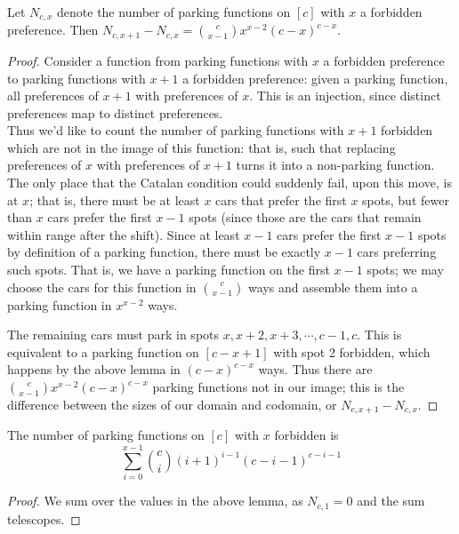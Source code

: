 \begin{lemma}
    Let $N_{c,x}$ denote the number of parking functions on $[c]$ with $x$ a forbidden preference. Then $N_{c,x+1}-N_{c,x}=\binom{c}{x-1}x^{x-2}(c-x)^{c-x}.$
\end{lemma}

\begin{proof}
    Consider a function from parking functions with $x$ a forbidden preference to parking functions with $x+1$ a forbidden preference: given a parking function, all preferences of $x+1$ with preferences of $x.$ This is an injection, since distinct preferences map to distinct preferences.\\
    
    Thus we'd like to count the number of parking functions with $x+1$ forbidden which are not in the image of this function: that is, such that replacing preferences of $x$ with preferences of $x+1$ turns it into a non-parking function.\\

    The only place that the Catalan condition could suddenly fail, upon this move, is at $x$; that is, there must be at least $x$ cars that prefer the first $x$ spots, but fewer than $x$ cars prefer the first $x-1$ spots (since those are the cars that remain within range after the shift). Since at least $x-1$ cars prefer the first $x-1$ spots by definition of a parking function, there must be exactly $x-1$ cars preferring such spots. That is, we have a parking function on the first $x-1$ spots; we may choose the cars for this function in $\binom{c}{x-1}$ ways and assemble them into a parking function in $x^{x-2}$ ways.

    The remaining cars must park in spots $x,x+2,x+3,\cdots,c-1,c.$ This is equivalent to a parking function on $[c-x+1]$ with spot 2 forbidden, which happens by the above lemma in $(c-x)^{c-x}$ ways. Thus there are $\binom{c}{x-1}x^{x-2}(c-x)^{c-x}$ parking functions not in our image; this is the difference between the sizes of our domain and codomain, or $N_{c,x+1}-N_{c,x}.$
\end{proof}

\begin{proposition}
    The number of parking functions on $[c]$ with $x$ forbidden is $$\sum_{i=0}^{x-1}\binom{c}{i}(i+1)^{i-1}(c-i-1)^{c-i-1}$$
\end{proposition}

\begin{proof}
    We sum over the values in the above lemma, as $N_{c,1}=0$ and the sum telescopes.
\end{proof}

